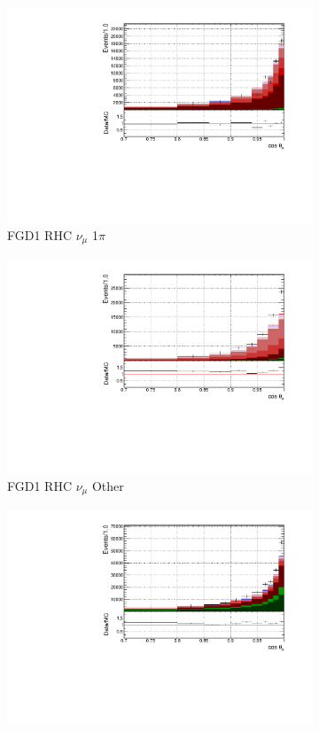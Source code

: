 \begin{figure}
\begin{subfigure}{.32\textwidth}
  \includegraphics[width=0.95\linewidth]{figs/FGD1_NuMuBkg_CC1pi_in_AntiNu_Mode_t}
  \caption{FGD1 RHC $\nu_{\mu}$ 1$\pi$}
  \label{fig:tstack_FGD1_NuMuBkg_CC1pi_in_AntiNu_Mode}
\end{subfigure}
\begin{subfigure}{.32\textwidth}
  \centering
  \includegraphics[width=0.95\linewidth]{figs/FGD1_NuMuBkg_CCOther_in_AntiNu_Mode_t}
  \caption{FGD1 RHC $\nu_{\mu}$ Other}
  \label{fig:tstack_FGD1_NuMuBkg_CCOther_in_AntiNu_Mode}
\end{subfigure}
\begin{subfigure}{.32\textwidth}
  \centering
  \includegraphics[width=0.95\linewidth]{figs/FGD2_NuMuBkg_CC0pi_in_AntiNu_Mode_t}

\end{subfigure}
\end{figure}
